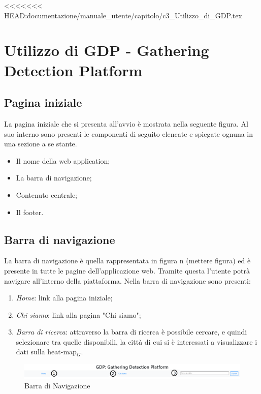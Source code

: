 <<<<<<< HEAD:documentazione/manuale_utente/capitolo/c3_Utilizzo_di_GDP.tex
\chapter{Utilizzo di GDP - Gathering Detection Platform}\label{UtilizzoDiGDPGatheringDetecionPlatform}

\section{Pagina iniziale}\label{UtilizzoDiGDPGatheringDetecionPlatformPaginaIniziale}
La pagina iniziale che si presenta all'avvio è mostrata nella seguente figura.
Al suo interno sono presenti le componenti di seguito elencate e spiegate ognuna in una sezione a se stante.
\begin{itemize}
	\item Il nome della web application;
	\item La barra di navigazione;
	\item Contenuto centrale;
	\item Il footer.
\end{itemize}

\section{Barra di navigazione}\label{UtilizzoDiGDPGatheringDetecionPlatformBarraDiNavigazione}

La barra di navigazione è quella rappresentata in figura n (mettere figura) ed è presente in tutte le pagine dell'applicazione web. Tramite questa l'utente potrà navigare all'interno della piattaforma. Nella barra di navigazione sono presenti:
\begin{enumerate}
	\item \textit{Home}: link alla pagina iniziale;
	\item \textit{Chi siamo}: link alla pagina "Chi siamo";
	\item \textit{Barra di ricerca}: attraverso la barra di ricerca è possibile cercare, e quindi selezionare tra quelle disponibili, la città di cui si è interessati a visualizzare i dati sulla heat-map$_G$. 
\end{enumerate}

\begin{center}
	\begin{figure}
		\includegraphics[width=1\linewidth]{../immagini/manualeUtente/BarraDiNavigazioe.png}
		\caption{Barra di Navigazione}
	\end{figure}
\end{center}

